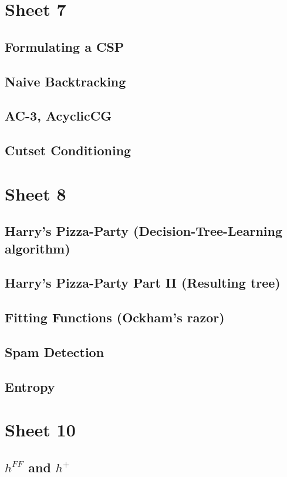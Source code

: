\documentclass{article}
\begin{document}
\section{Sheet 7}
    \subsection{Formulating a CSP}
    \subsection{Naive Backtracking}
    \subsection{AC-3, AcyclicCG}
    \subsection{Cutset Conditioning}
    

\section{Sheet 8}
    \subsection{Harry's Pizza-Party (Decision-Tree-Learning algorithm)}
    \subsection{Harry's Pizza-Party Part II (Resulting tree)}
    \subsection{Fitting Functions (Ockham's razor)}
    \subsection{Spam Detection}
    \subsection{Entropy}
    

\section{Sheet 10}
    \subsection{$h^{FF}$ and $h^+$}
\end{document}
